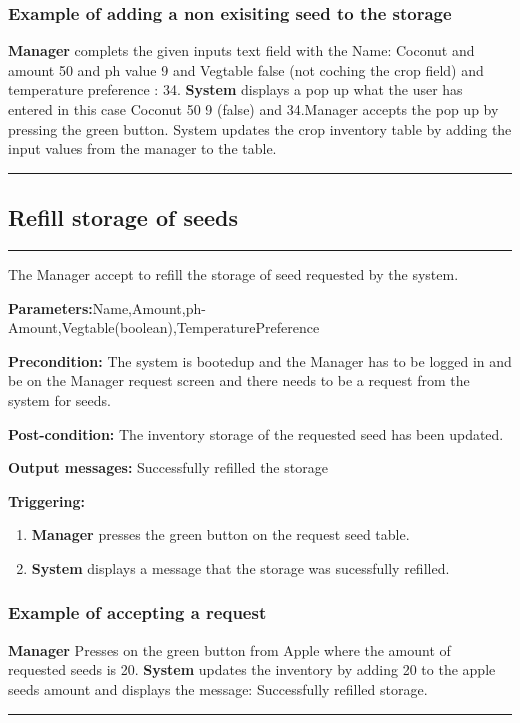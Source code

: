 \subsubsection{Example of adding a non exisiting seed to the storage}
\textbf{Manager} complets the given inputs text field with the
Name: Coconut and amount 50 and ph value 9 and Vegtable false
(not coching the crop field) and temperature preference : 34. \textbf{System}
displays a pop up  what the user has entered in this case Coconut 50 9 (false)
and 34.Manager accepts the pop up by pressing the green button. System updates
the crop inventory table by adding the input values from the manager to the
table.
\hfill
\vspace{0.5cm}
\hrule

\break
\subsection{Refill storage of seeds}

\hrule
\hfill
\vspace{0.5cm}

\label{operation:Refill storage System request}

The Manager accept to refill the storage of seed requested by the system.
\begin{description}
\item
\textbf{Parameters:}Name,Amount,ph-Amount,Vegtable(boolean),TemperaturePreference
\item \textbf{Precondition:} The system is bootedup and the Manager has to be
logged in and be on the Manager request screen and there needs to be a request
from the system for seeds.
\item \textbf{Post-condition:} The inventory storage of the requested seed has
been updated.
\item 
\item \item \textbf{Output messages:} Successfully refilled the storage
\item \textbf{Triggering:}
\begin{enumerate}
\item \textbf{Manager} presses the green button on the request seed table.
\item \textbf{System} displays a message that the storage was sucessfully
refilled.
\end{enumerate}
\end{description}

\subsubsection{Example of accepting a request}
\textbf{Manager} Presses on the green button from Apple where the amount of
requested seeds is 20. \textbf{System} updates the inventory by adding 20 to the
apple seeds amount and displays the message: Successfully refilled storage.
\hfill
\vspace{0.5cm}
\hrule




